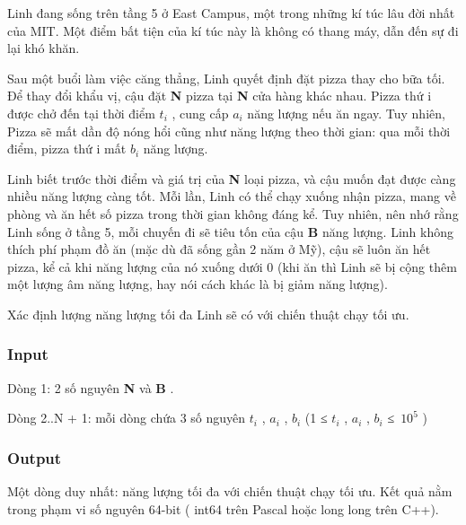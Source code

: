 





    Linh đang sống trên tầng 5 ở East Campus, một trong những kí túc lâu đời nhất của MIT. Một điểm bất tiện của kí túc này là không có thang máy, dẫn đến sự đi lại khó khăn.   



   Sau một buổi làm việc căng thẳng, Linh quyết định đặt pizza thay cho bữa tối. Để thay đổi khẩu vị, cậu đặt   \textbf{    N   }   pizza tại   \textbf{    N   }   cửa hàng khác nhau. Pizza thứ i được chở đến tại thời điểm   \textbf{    $t_{i}$}   , cung cấp   \textbf{    $a_{i}$}   năng lượng nếu ăn ngay. Tuy nhiên, Pizza sẽ mất dần độ nóng hổi cũng như năng lượng theo thời gian: qua mỗi thời điểm, pizza thứ i mất   \textbf{    $b_{i}$}   năng lượng.  

     Linh biết trước thời điểm và giá trị của     \textbf{      N     }     loại pizza, và cậu muốn đạt được càng nhiều năng lượng càng tốt. Mỗi lần, Linh có thể chạy xuống nhận pizza, mang về phòng và ăn hết số pizza trong thời gian không đáng kể. Tuy nhiên, nên nhớ rằng Linh sống ở tầng 5, mỗi chuyến đi sẽ tiêu tốn của cậu     \textbf{      B     }     năng lượng. Linh không thích phí phạm đồ ăn (mặc dù đã sống gần 2 năm ở Mỹ), cậu sẽ luôn ăn hết pizza, kể cả khi năng lượng của nó xuống dưới 0 (khi ăn thì Linh sẽ bị cộng thêm một lượng âm năng lượng, hay nói cách khác là bị giảm năng lượng).    

      Xác định lượng năng lượng tối đa Linh sẽ có với chiến thuật chạy tối ưu.     

\subsubsection{   Input  }

   Dòng 1: 2 số nguyên   \textbf{    N   }   và   \textbf{    B   }   .  

   Dòng 2..N + 1: mỗi dòng chứa 3 số nguyên   \textbf{    $t_{i}$}   ,   \textbf{    $a_{i}$}   ,   \textbf{    $b_{i}$}   (1 ≤   \textbf{    $t_{i}$}   ,   \textbf{    $a_{i}$}   ,   \textbf{    $b_{i}$}   ≤ $10^{5}$   )  

\subsubsection{   Output  }

   Một dòng duy nhất: năng lượng tối đa với chiến thuật chạy tối ưu. Kết quả nằm trong phạm vi số nguyên 64-bit (   int64   trên Pascal hoặc   long long   trên C++).  

